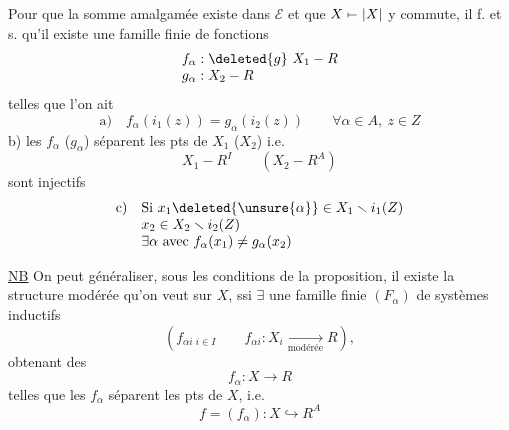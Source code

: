 Pour que la somme amalgamée existe dans  $\mathcal E$ et que $X\mathrel{\mapstochar\relbar}|X|$ y commute, il f. et s. qu'il existe une famille finie de  fonctions
\[
\begin{array}{l}
f_\alpha:\deleted{g}\ X_1\mathbin{-}R\\
g_\alpha:X_2\mathbin{-}R
\end{array}
\]
telles que l'on ait
\[
\text{a)}\quad f_\alpha(i_1(z))=g_\alpha(i_2(z))\qquad\forall\alpha\in A,\ z\in Z
\]
b)  les $f_\alpha$ ($g_\alpha$) séparent les pts de $X_1$ ($X_2$) i.e.
\[
 X_1\mathbin{-}R^I\qquad(X_2\mathbin{-}R^A)
\]
sont injectifs
\[
\begin{array}{ll}
\text{c)}&\text{Si }x_1\deleted{\unsure{\alpha}}\in X_1\smallsetminus i_1(Z)\\
&x_2\in X_2\smallsetminus i_2(Z)\\
&\exists\alpha\text{ avec }f_\alpha(x_1)\ne g_\alpha(x_2)
\end{array}
\]

\uline{NB} On peut généraliser, sous les conditions de la proposition, il existe la structure modérée qu'on veut sur $X$, ssi $\exists$ une famille finie $(F_\alpha)$  de systèmes inductifs
\[
 (f_{\alpha i}\,{}_{i\in I}\qquad f_{\alpha i}:X_i\underset{\text{modérée}}{\longrightarrow}R),
\]
obtenant des
\[
 f_\alpha:X\longrightarrow R
\]
telles que les $f_\alpha$ séparent les pts de $X$, i.e.
\[
 f=(f_\alpha):X\hookrightarrow R^A
\]
